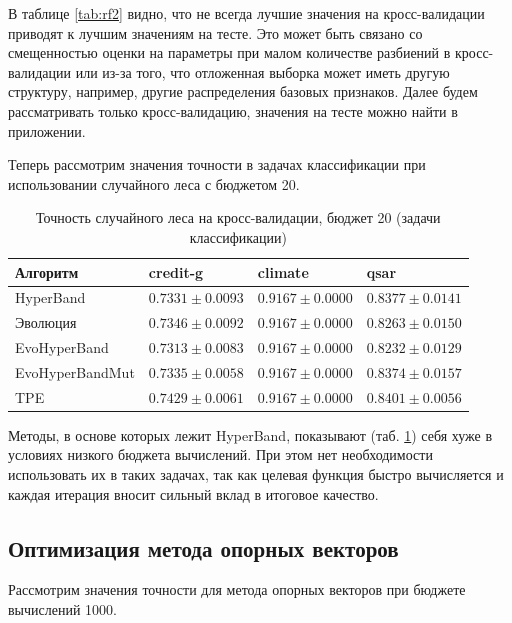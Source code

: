\documentclass[a4paper,12pt]{article}
\begin{document}
В таблице \ref{tab:rf2} видно, что не всегда лучшие значения на кросс-валидации приводят к лучшим значениям на тесте. Это может быть связано со смещенностью оценки на параметры при малом количестве разбиений в кросс-валидации или из-за того, что отложенная выборка может иметь другую структуру, например, другие распределения базовых признаков. Далее будем рассматривать только кросс-валидацию, значения на тесте можно найти в приложении.

Теперь рассмотрим значения точности в задачах классификации при использовании случайного леса с бюджетом 20.

\begin{table}[h]
\centering
\begin{tabular}{|l|l|l|l|}
\hline
Алгоритм               & credit-g                     & climate             & qsar                         \\ \hline
HyperBand              & $0.7331 \pm 0.0093$          & $0.9167 \pm 0.0000$ & $0.8377 \pm 0.0141$          \\ \hline
Эволюция               & $0.7346 \pm 0.0092$          & $0.9167 \pm 0.0000$ & $0.8263 \pm 0.0150$          \\ \hline
EvoHyperBand           & $0.7313 \pm 0.0083$          & $0.9167 \pm 0.0000$ & $0.8232 \pm 0.0129$          \\ \hline
EvoHyperBandMut & $0.7335 \pm 0.0058$          & $0.9167 \pm 0.0000$ & $0.8374 \pm 0.0157$          \\ \hline
TPE                    & $\mathbf{0.7429 \pm 0.0061}$ & $0.9167 \pm 0.0000$ & $\mathbf{0.8401 \pm 0.0056}$ \\ \hline
\end{tabular}
\caption{Точность случайного леса на кросс-валидации, бюджет 20 (задачи классификации)}
\label{tab:rf3}
\end{table}

Методы, в основе которых лежит HyperBand, показывают (таб. \ref{tab:rf3}) себя хуже в условиях низкого бюджета вычислений. При этом нет необходимости использовать их в таких задачах, так как целевая функция быстро вычисляется и каждая итерация вносит сильный вклад в итоговое качество.

\subsection{Оптимизация метода опорных векторов}

Рассмотрим значения точности для метода опорных векторов при бюджете вычислений 1000.
\end{document}
